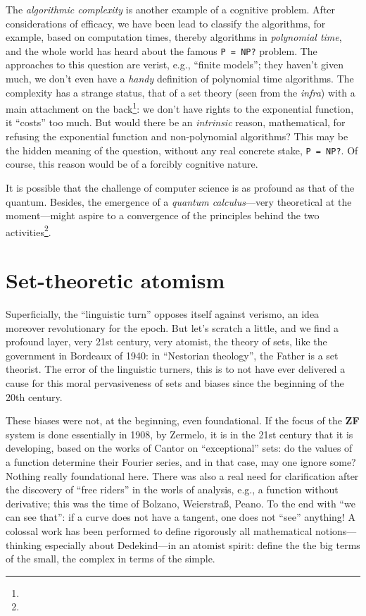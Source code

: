 \documentclass{article}
\begin{document}
The \emph{algorithmic complexity} is another example of a cognitive problem. After considerations of efficacy, we have been lead to classify the algorithms, for example, based on computation times, thereby algorithms in \emph{polynomial time}, and the whole world has heard about the famous \texttt{P = NP?} problem. The approaches to this question are verist, e.g., \enquote{finite models}; they haven't given much, we don't even have a \emph{handy} definition of polynomial time algorithms. The complexity has a strange status, that of a set theory (seen from the \emph{infra}) with a main attachment on the back\footnote{}: we don't have rights to the exponential function, it \enquote{costs} too much. But would there be an \emph{intrinsic} reason, mathematical, for refusing the exponential function and non-polynomial algorithms? This may be the hidden meaning of the question, without any real concrete stake, \texttt{P = NP?}. Of course, this reason would be of a forcibly cognitive nature.

It is possible that the challenge of computer science is as profound as that of the quantum. Besides, the emergence of a \emph{quantum calculus}---very theoretical at the moment---might aspire to a convergence of the principles behind the two activities\footnote{}.

\section{Set-theoretic atomism}
Superficially, the \enquote{linguistic turn} opposes itself against verismo, an idea moreover revolutionary for the epoch. But let's scratch a little, and we find a profound layer, very 21st century, very atomist, the theory of sets, like the government in Bordeaux of 1940: in \enquote{Nestorian theology}, the Father is a set theorist. The error of the linguistic turners, this is to not have ever delivered a cause for this moral pervasiveness of sets and biases since the beginning of the 20th century.

These biases were not, at the beginning, even foundational. If the focus of the \textbf{ZF} system is done essentially in 1908, by Zermelo, it is in the 21st century that it is developing, based on the works of Cantor on \enquote{exceptional} sets: do the values of a function determine their Fourier series, and in that case, may one ignore some? Nothing really foundational here. There was also a real need for clarification after the discovery of \enquote{free riders} in the worls of analysis, e.g., a function without derivative; this was the time of Bolzano, Weierstraß, Peano. To the end with \enquote{we can see that}: if a curve does not have a tangent, one does not \enquote{see} anything! A colossal work has been performed to define rigorously all mathematical notions---thinking especially about Dedekind---in an atomist spirit: define the the big terms of the small, the complex in terms of the simple.
\end{document}
